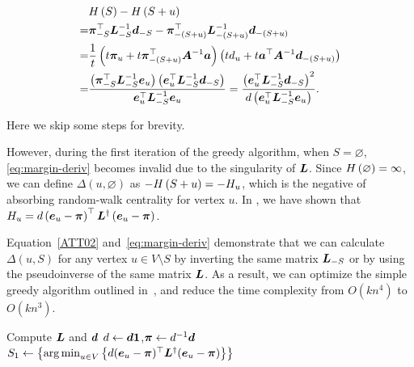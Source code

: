 \documentclass[10pt,twocolumn,twoside]{IEEEtran}
\begin{document}
\begin{equation}\label{eq:margin-deriv}
    \begin{split}
        &H\left(S\right)-H\left(S+u\right)\\
        =&\boldsymbol{\pi}_{-S}^\top\boldsymbol{L}_{-S}^{-1}\boldsymbol{d}_{-S}-\boldsymbol{\pi}_{-(S+u)}^\top\boldsymbol{L}_{-(S+u)}^{-1}\boldsymbol{d}_{-(S+u)}\\
        =&\frac1t\left( t\boldsymbol{\pi}_u+t\boldsymbol{\pi}_{-(S+u)}^\top\boldsymbol{A}^{-1}\boldsymbol{a} \right)\left( td_u+t\boldsymbol{a}^\top\boldsymbol{A}^{-1}\boldsymbol{d}_{-(S+u)} \right)\\
        =&\frac{\left( \boldsymbol{\pi}_{-S}^\top\boldsymbol{L}_{-S}^{-1}\boldsymbol{e}_u \right)\left( \boldsymbol{e}_u^\top\boldsymbol{L}_{-S}^{-1}\boldsymbol{d}_{-S} \right)}{\boldsymbol{e}_u^\top\boldsymbol{L}_{-S}^{-1}\boldsymbol{e}_u}=\frac{\left( \boldsymbol{e}_u^\top\boldsymbol{L}_{-S}^{-1}\boldsymbol{d}_{-S} \right)^2}{d\left( \boldsymbol{e}_u^\top\boldsymbol{L}_{-S}^{-1}\boldsymbol{e}_u \right)}.
    \end{split}
\end{equation}

Here we skip some steps for brevity.

However, during the first iteration of the greedy algorithm, when \(S=\varnothing\), \eqref{eq:margin-deriv} becomes invalid due to the singularity of \(\boldsymbol{L}\).
Since \(H\left(\varnothing\right)=\infty\), we can define \(\Delta(u,\varnothing)\) as \(-H\left(S+u\right)=-H_u\), which is the negative of absorbing random-walk centrality for vertex \(u\).
In , we have shown that \(H_u=d\left( \boldsymbol{e}_u-\boldsymbol{\pi} \right)^\top\boldsymbol{L}^{\dagger}\left( \boldsymbol{e}_u-\boldsymbol{\pi} \right)\).

Equation~\eqref{ATT02} and~\eqref{eq:margin-deriv} demonstrate that we can calculate \(\Delta(u,S)\) for any vertex \(u\in V\setminus S\) by inverting the same matrix \(\boldsymbol{L}_{-S}\) or by using the pseudoinverse of the same matrix \(\boldsymbol{L}\).
As a result, we can optimize the simple greedy algorithm outlined in~, and reduce the time complexity from \(O(kn^4)\) to \(O(kn^3)\).

\begin{algorithm}
    \caption{\((\gr,k)\)}
    \label{algo:exact-agcm}
    Compute \(\boldsymbol{L}\) and \(\boldsymbol{d}\)\;
    \(d\gets\boldsymbol{d}\boldsymbol{1}\),\(\boldsymbol{\pi}\gets {d}^{-1}\boldsymbol{d}\)\;
    \(S_1\gets\left\{\operatorname*{arg\,min}_{u\in V}\left\{d(\boldsymbol{e}_u-\boldsymbol{\pi})^\top\boldsymbol{L}^\dagger(\boldsymbol{e}_u-\boldsymbol{\pi}) \right\} \right\}\)\;
\end{algorithm}
\end{document}
